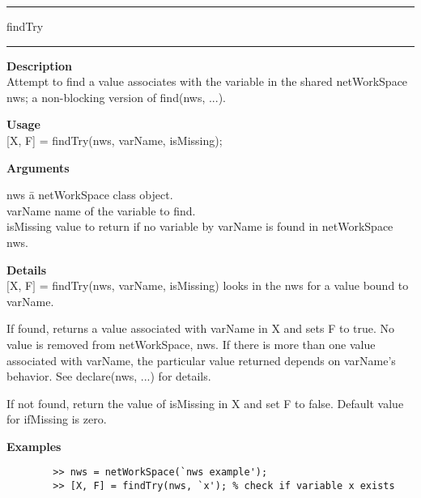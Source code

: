 \rule[0.06in]{6in}{0.01in}
\newline
findTry
\newline
\rule{6in}{0.01in}
\begin{list}{}{}
	\item {\bf Description}\\
	Attempt to find a value associates with the variable in the shared netWorkSpace nws;	a non-blocking version of find(nws, ...).
	\item {\bf Usage\\}
	[X, F] = findTry(nws, varName, isMissing);
	\item {\bf Arguments}
		\begin{tabbing}
		nws \hspace{2.5cm} \=  a netWorkSpace class object.\\
		varName \> name  of the variable to find.\\
		isMissing \> value to return if no variable by varName is found in netWorkSpace nws.
		\end{tabbing}
	\item {\bf Details}\\
	$[$X, F$]$ = findTry(nws, varName, isMissing) looks in the nws for a value bound to varName.
      
	If found, returns a value associated with varName in X and sets F to true. 
	No value is removed from netWorkSpace, nws. If there is more than one value associated with 
	varName, the particular value returned depends on varName's behavior. 
	See declare(nws, ...) for details.
      
	If not found, return the value of isMissing in X and set F to false.
	Default value for ifMissing is zero. 

	\item {\bf Examples}
		\begin{verbatim}
		>> nws = netWorkSpace(`nws example');
		>> [X, F] = findTry(nws, `x'); % check if variable x exists
		\end{verbatim}
\end{list}

